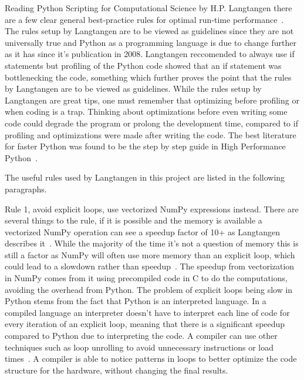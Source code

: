 \documentclass[12pt, a4paper]{article}
\begin{document}
Reading Python Scripting for Computational Science by H.P. Langtangen there are a few clear general best-practice rules for optimal run-time performance~\cite{pythonBook}.
The rules setup by Langtangen are to be viewed as guidelines since they are not universally true and Python as a programming language is due to change further as it has since it's publication in 2008.
Langtangen reccomended to always use if statements but profiling of the Python code showed that an if statement was bottlenecking the code, something which further proves the point that the rules by Langtangen are to be viewed as guidelines.
While the rules setup by Langtangen are great tips, one must remember that optimizing before profiling or when coding is a trap.
Thinking about optimizations before even writing some code could degrade the program or prolong the development time, compared to if profiling and optimizations were made after writing the code.
The best literature for faster Python was found to be the step by step guide in High Performance Python~\cite{oreilly}.

The useful rules used by Langtangen in this project are listed in the following paragraphs.

Rule 1, avoid explicit loops, use vectorized NumPy expressions instead.
There are several things to the rule, if it is possible and the memory is available a vectorized NumPy operation can see a speedup factor of 10+ as Langtangen describes it~\cite{NumpyArray}.
While the majority of the time it's not a question of memory this is still a factor as NumPy will often use more memory than an explicit loop, which could lead to a slowdown rather than speedup~\cite{NumpyVectorization}.
The speedup from vectorization in NumPy comes from it using precompiled code in C to do the computations, avoiding the overhead from Python.
The problem of explicit loops being slow in Python stems from the fact that Python is an interpreted language.
In a compiled language an interpreter doesn't have to interpret each line of code for every iteration of an explicit loop, meaning that there is a significant speedup compared to Python due to interpreting the code.
A compiler can use other techniques such as loop unrolling to avoid unnecessary instructions or load times~\cite{wiki:LoopUnroll}.
A compiler is able to notice patterns in loops to better optimize the code structure for the hardware, without changing the final results.
\end{document}
